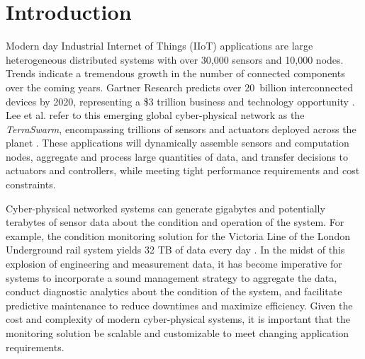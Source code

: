 \section{Introduction} 


Modern day Industrial Internet of Things (IIoT) applications are large heterogeneous distributed systems with over 30,000 sensors and 10,000 nodes.
Trends indicate a tremendous growth in the number of connected components over the coming years.
Gartner Research predicts over 20~billion interconnected devices by 2020, representing a \$3 trillion business and technology opportunity \cite{Gartner_IoT_2020}.
Lee et al. refer to this emerging global cyber-physical network as the \emph{TerraSwarm}, encompassing trillions of sensors and actuators deployed across the planet \cite{SwarmAtEdgeOfCloud}.
These applications will dynamically assemble sensors and computation nodes, aggregate and process large quantities of data, and transfer decisions to actuators and controllers, while meeting tight performance requirements and cost constraints.

Cyber-physical networked systems can generate gigabytes and potentially terabytes of sensor data about the condition and operation of the system.
For example, the condition monitoring solution for the Victoria Line of the London Underground rail system yields 32 TB of data every day \cite{NITrendWatch2016}. 
In the midst of this explosion of engineering and measurement data, it has become imperative for systems to incorporate a sound management strategy to aggregate the data, conduct diagnostic analytics about the condition of the system, and facilitate predictive maintenance to reduce downtimes and maximize efficiency.
Given the cost and complexity of modern cyber-physical systems, it is important that the monitoring solution be scalable and customizable to meet changing application requirements.

